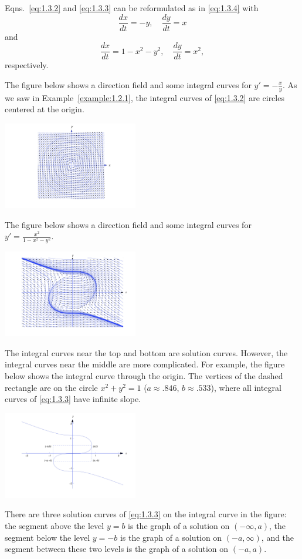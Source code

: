 \documentclass{ximera}
\begin{document}
Eqns.~\eqref{eq:1.3.2} and \eqref{eq:1.3.3} can be reformulated as in
\eqref{eq:1.3.4} with
$$
\frac{dx}{dt}=-y,\quad \frac{dy}{dt}=x
$$
and
$$
\frac{dx}{dt}=1-x^2-y^2,\quad \frac{dy}{dt}=x^2,
$$
respectively. 

The figure below shows a direction field and some integral curves
for $y'=-\frac{x}{y}$. As we saw in
Example~\ref{example:1.2.1}, the integral curves of \eqref{eq:1.3.2}
are circles centered at the origin.

\begin{image}
\includegraphics[height=1.5in]{fig010305.jpg}
\end{image}

The figure below shows a direction field and some integral curves
for $y'=\frac{x^2}{1-x^2-y^2}$. 
\begin{image}
\includegraphics[height=1.5in]{fig010306.jpg}
\end{image}
The integral curves near the top and bottom are
solution curves. However, the integral curves near the middle are more
complicated. For example, the figure below shows the integral
curve through the origin. The vertices of the dashed rectangle are on
the circle $x^2+y^2=1$ ($a\approx.846$, $b\approx.533$), where all
integral curves of \eqref{eq:1.3.3} have infinite slope. 
\begin{image}
\includegraphics[height=1.5in]{fig010307.jpg}
\end{image}
There are
three solution curves of \eqref{eq:1.3.3} on the integral curve in the
figure: the segment above the level $y=b$ is the graph of a solution
on $(-\infty,a)$, the segment below the level $y=-b$ is the graph of a
solution on $(-a,\infty)$, and the segment between these two levels is
the graph of a solution on $(-a,a)$.
\end{document}
